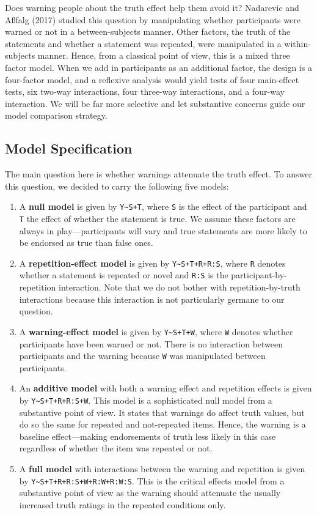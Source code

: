 \documentclass[
  english,
  ,man]{apa6}
\begin{document}
Does warning people about the truth effect help them avoid it? Nadarevic and Aßfalg (2017) studied this question by manipulating whether participants were warned or not in a between-subjects manner. Other factors, the truth of the statements and whether a statement was repeated, were manipulated in a within-subjects manner. Hence, from a classical point of view, this is a mixed three factor model. When we add in participants as an additional factor, the design is a four-factor model, and a reflexive analysis would yield tests of four main-effect tests, six two-way interactions, four three-way interactions, and a four-way interaction. We will be far more selective and let substantive concerns guide our model comparison strategy.

\hypertarget{model-specification}{%
\subsection{Model Specification}\label{model-specification}}

The main question here is whether warnings attenuate the truth effect. To answer this question, we decided to carry the following five models:

\begin{enumerate}
\def\labelenumi{\alph{enumi}.}
\item
  A \textbf{null model} is given by \texttt{Y\textasciitilde{}S+T}, where \texttt{S} is the effect of the participant and \texttt{T} the effect of whether the statement is true. We assume these factors are always in play---participants will vary and true statements are more likely to be endorsed as true than false ones.
\item
  A \textbf{repetition-effect model} is given by \texttt{Y\textasciitilde{}S+T+R+R:S}, where \texttt{R} denotes whether a statement is repeated or novel and \texttt{R:S} is the participant-by-repetition interaction. Note that we do not bother with repetition-by-truth interactions because this interaction is not particularly germane to our question.
\item
  A \textbf{warning-effect model} is given by \texttt{Y\textasciitilde{}S+T+W}, where \texttt{W} denotes whether participants have been warned or not. There is no interaction between participants and the warning because \texttt{W} was manipulated between participants.
\item
  An \textbf{additive model} with both a warning effect and repetition effects is given by \texttt{Y\textasciitilde{}S+T+R+R:S+W}. This model is a sophisticated null model from a substantive point of view. It states that warnings do affect truth values, but do so the same for repeated and not-repeated items. Hence, the warning is a baseline effect---making endorsements of truth less likely in this case regardless of whether the item was repeated or not.
\item
  A \textbf{full model} with interactions between the warning and repetition is given by \texttt{Y\textasciitilde{}S+T+R+R:S+W+R:W+R:W:S}. This is the critical effects model from a substantive point of view as the warning should attenuate the usually increased truth ratings in the repeated conditions only.
\end{enumerate}
\end{document}
